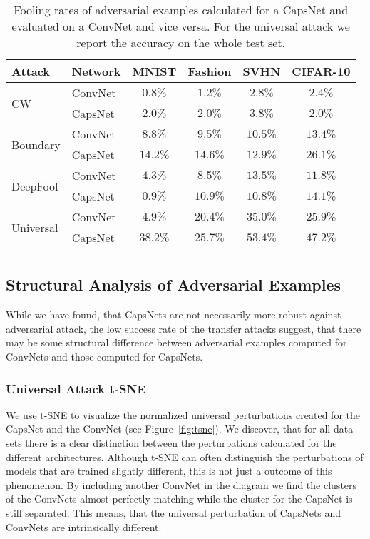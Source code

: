 		
\begin{table}
	\centering
	\begin{tabular}{llcccc}
		\toprule
		Attack & Network       & MNIST & Fashion & SVHN & CIFAR-10  \\
		\midrule
		\multirow{2}{*}{CW} & ConvNet & $0.8\%$ & $1.2\%$ & $2.8\%$ & $2.4\%$ \\
		& CapsNet            & $2.0\%$ & $2.0\%$ & $3.8\%$ & $2.0\%$ \\
		\midrule
		\multirow{2}{*}{Boundary} & ConvNet & $8.8\%$ & $9.5\%$ & $10.5\%$ & $13.4\%$ \\
		& CapsNet            & $14.2\%$ & $14.6\%$ & $12.9\%$ & $26.1\%$ \\
		\midrule
		\multirow{2}{*}{DeepFool} & ConvNet & $4.3\%$ & $8.5\%$ & $13.5\%$ & $11.8\%$ \\
		& CapsNet           & $0.9\%$ & $10.9\%$ & $10.8\%$ & $14.1\%$ \\
		\midrule
		\multirow{2}{*}{Universal} & ConvNet & $4.9\%$ & $20.4\%$ & $35.0\%$ & $25.9\%$ \\
		& CapsNet           & $38.2\%$ & $25.7\%$ & $53.4\%$ & $47.2\%$ \\
		\bottomrule\\
	\end{tabular}
	\caption[Transfer Fooling Rates]{Fooling rates of adversarial examples calculated for a CapsNet and evaluated on a ConvNet and vice versa. For the universal attack we report the accuracy on the whole test set.}
	\label{tab:transfer}
\end{table}

\subsection{Structural Analysis of Adversarial Examples}

While we have found, that CapsNets are not necessarily more robust against adversarial attack, the low success rate of the transfer attacks suggest, that there may be some structural difference between adversarial examples computed for ConvNets and those computed for CapsNets.

\subsubsection{Universal Attack t-SNE}

We use t-SNE \citep{tsne} to visualize the normalized universal perturbations created for the CapsNet and the ConvNet (see Figure~\ref{fig:tsne}).
We discover, that for all data sets there is a clear distinction between the perturbations calculated for the different architectures.
Although t-SNE can often distinguish the perturbations of models that are trained slightly different, this is not just a outcome of this phenomenon.
By including another ConvNet in the diagram we find the clusters of the ConvNets almost perfectly matching while the cluster for the CapsNet is still separated.
This means, that the universal perturbation of CapsNets and ConvNets are intrinsically different.

